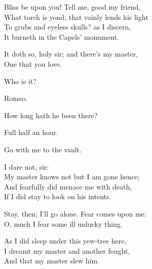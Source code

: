 \begin{speech}
Bliss be upon you! Tell me, good my friend, \\

What torch is yond, that vainly lends his light \\
To grubs and eyeless skulls? as I discern, \\
It burneth in the Capels' monument. \\
\end{speech}
\begin{speech}
It doth so, holy sir; and there's my master, \\
One that you love. \\
\end{speech}
\begin{speech}
Who is it? \\
\end{speech}
\begin{speech}
Romeo. \\
\end{speech}
\begin{speech}
How long hath he been there? \\
\end{speech}
\begin{speech}
Full half an hour. \\
\end{speech}
\begin{speech}
Go with me to the vault. \\
\end{speech}
\begin{speech}
I dare not, sir: \\
My master knows not but I am gone hence; \\
And fearfully did menace me with death, \\
If I did stay to look on his intents. \\
\end{speech}
\begin{speech}
Stay, then; I'll go alone.   Fear comes upon me:
\\
O, much I fear some ill unlucky thing. \\
\end{speech}
\begin{speech}
As I did sleep under this yew-tree here, \\
I dreamt my master and another fought, \\
And that my master slew him. \\
\end{speech}
